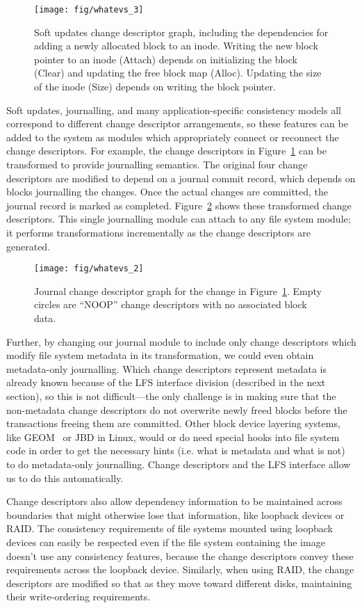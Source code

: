 \begin{figure}[b]
  \centering
  \texttt{[image: fig/whatevs\_3]}%
  \caption{\label{fig:softupdates} Soft updates change descriptor graph,
  including the dependencies for adding a newly allocated block to an
  inode. Writing the new block pointer to an inode (Attach) depends on
  initializing the block (Clear) and updating the free block map (Alloc).
  Updating the size of the inode (Size) depends on writing the block
  pointer.}
\end{figure}

Soft updates, journalling, and many application-specific consistency models all
correspond to different change descriptor arrangements, so these features can be
added to the system as modules which appropriately connect or reconnect the
change descriptors.
%
For example, the change descriptors in Figure~\ref{fig:softupdates} can be
transformed to provide journalling semantics. The original four change
descriptors are modified to depend on a journal commit record, which
depends on blocks journalling the changes. Once the actual changes are
committed, the journal record is marked as completed.
Figure~\ref{fig:journal} shows these transformed change descriptors.
%
This single journalling module can attach to any file system module;
it performs transformations incrementally as the change descriptors
are generated.

\begin{figure}
  \centering
  \texttt{[image: fig/whatevs\_2]}%
  \caption{\label{fig:journal} Journal change descriptor graph for the
    change in Figure~\ref{fig:softupdates}. Empty circles are
    ``NOOP'' change descriptors with no associated block data.}
\end{figure}

Further, by changing our journal module to include only change descriptors which
modify file system metadata in its transformation, we could even obtain
metadata-only journalling. Which change descriptors represent metadata is
already known because of the LFS interface division (described in the next
section), so this is not difficult---the only challenge is in making sure that
the non-metadata change descriptors do not overwrite newly freed blocks before
the transactions freeing them are committed. Other block device layering
systems, like GEOM~\cite{geom} or JBD in Linux, would or do need special hooks
into file system code in order to get the necessary hints (i.e.  what is
metadata and what is not) to do metadata-only journalling. Change descriptors
and the LFS interface allow us to do this automatically.

Change descriptors also allow dependency information to be maintained across
boundaries that might otherwise lose that information, like loopback devices or
RAID. The consistency requirements of file systems mounted using loopback
devices can easily be respected even if the file system containing the image
doesn't use any consistency features, because the change descriptors
convey these requirements across the loopback device. Similarly, when using
RAID, the change descriptors are modified so that as they move toward different
disks, maintaining their write-ordering requirements.